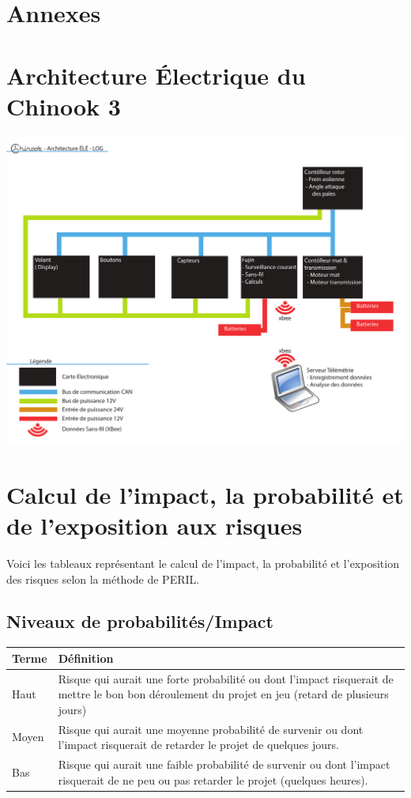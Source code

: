 \documentclass[11pt]{article}
\begin{document}
\section*{Annexes}
\begin{appendices}


\section{Architecture Électrique du Chinook 3}
\label{sec:archELE}
\includegraphics[height=1\textwidth,angle=90]{images/Architecture_ÉLÉ-LOG.pdf}

\clearpage
\section{Calcul de l'impact, la probabilité et de l'exposition aux risques}
\label{annexePERIL}
Voici les tableaux représentant le calcul de l'impact, la probabilité et l'exposition des risques selon la méthode de PERIL.

\subsection{Niveaux de probabilités/Impact}


\begin{tabu} to \linewidth {lX}
  Terme & Définition \\
  \hline
  Haut & Risque qui aurait une forte probabilité ou dont l'impact risquerait de mettre le bon bon déroulement du projet en jeu (retard de plusieurs jours) \\
  Moyen & Risque qui aurait une moyenne probabilité de survenir ou dont l'impact risquerait de retarder le projet de quelques jours.\\
  Bas & Risque qui aurait une faible probabilité de survenir ou dont l'impact risquerait de ne peu ou pas retarder le projet (quelques heures). 
\end{tabu}


\end{appendices}
\end{document}

